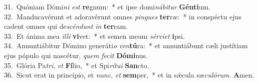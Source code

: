{31.~}Quóniam Dómi\textit{ni} \textit{est} \textbf{re}gnum:~* et ipse domi\textit{ná}\textit{bi}\textit{tur} \textbf{Gén}\textbf{ti}um.\\
{32.~}Manducavérunt et adoravérunt omnes \textit{pin}\textit{gues} \textbf{ter}ræ:~* in conspéctu ejus cadent omnes qui de\textit{scén}\textit{dunt} \textit{in} \textbf{ter}ram.\\
{33.~}Et ánima mea \textit{il}\textit{li} \textbf{vi}vet:~* et semen meum \textit{sér}\textit{vi}\textit{et} \textbf{i}psi.\\
{34.~}Annuntiábitur Dómino generáti\textit{o} \textit{ven}\textbf{tú}ra:~* et annuntiábunt cæli justítiam ejus pópulo qui nascétur, \textit{quem} \textit{fe}\textit{cit} \textbf{Dó}\textbf{mi}nus.\\
{35.~}Glória Pa\textit{tri}, \textit{et} \textbf{Fí}lio,~* et Spi\textit{rí}\textit{tu}\textit{i} \textbf{San}cto.\\
{36.~}Sicut erat in princípio, et \textit{nunc}, \textit{et} \textbf{sem}per,~* et in sǽcula sæ\textit{cu}\textit{ló}\textit{rum}. \textbf{A}men.\\
